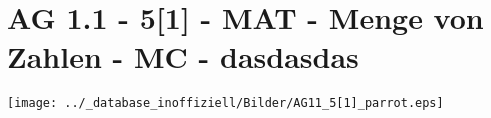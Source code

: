 \section{AG 1.1 - 5[1] - MAT - Menge von Zahlen - MC - dasdasdas}

\begin{beispiel}[AG 1.1]{1}
 \texttt{[image: ../\_database\_inoffiziell/Bilder/AG11\_5[1]\_parrot.eps]}
\end{beispiel}